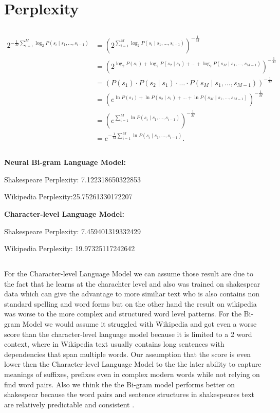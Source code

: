 \documentclass{article}
\begin{document}
\section{Perplexity}
\subsection{}
\begin{align*}
2^{-\frac{1}{M} \sum_{i=1}^{M} \log_2 P(s_i \mid s_1, \dots, s_{i-1})} 
&= \left(2^{\sum_{i=1}^{M} \log_2 P(s_i \mid s_1, \dots, s_{i-1})}\right)^{-\frac{1}{M}} \\
&= \left(2^{\log_2 P(s_1) + \log_2 P(s_2 \mid s_1) + \dots + \log_2 P(s_M \mid s_1, \dots, s_{M-1})}\right)^{-\frac{1}{M}} \\
&= \left(P(s_1) \cdot P(s_2 \mid s_1) \cdot \dots \cdot P(s_M \mid s_1, \dots, s_{M-1})\right)^{-\frac{1}{M}} \\
&= \left(e^{\ln P(s_1) + \ln P(s_2 \mid s_1) + \dots + \ln P(s_M \mid s_1, \dots, s_{M-1})}\right)^{-\frac{1}{M}} \\
&= \left(e^{\sum_{i=1}^{M} \ln P(s_i \mid s_1, \dots, s_{i-1})}\right)^{-\frac{1}{M}} \\
&= e^{-\frac{1}{M} \sum_{i=1}^{M} \ln P(s_i \mid s_1, \dots, s_{i-1})}.
\end{align*}
\subsection{}
\textbf{Neural Bi-gram Language Model:}

Shakespeare Perplexity:
7.122318650322853

Wikipedia Perplexity:25.75261330172207

\textbf{Character-level Language
Model:}

Shakespeare Perplexity: 7.459401319332429

Wikipedia Perplexity: 19.97325117242642
\subsection{}
For the Character-level Language Model we can assume those result are due to the fact that he learns at the charachter level and also was trained on shakespear data which can give the advantage to more similiar text who is also contains non standard spelling and word forms but on the other hand the result on wikipedia was worse to the more complex and structured word level patterns.
For the Bi-gram Model we would assume it struggled with Wikipedia and got even a worse score than the character-level language model because it is limited to a 2 word context, where in Wikipedia text usually contains long sentences with dependencies that span multiple words. Our assumption that the score is even lower then the Character-level Language Model to the the later ability to capture meanings of suffixes, prefixes even in complex modern words while not relying on find word pairs.
Also we think the the Bi-gram model performs better on shakespear because the word pairs and sentence structures in shakespeares text are relatively predictable and consistent .
\end{document}
